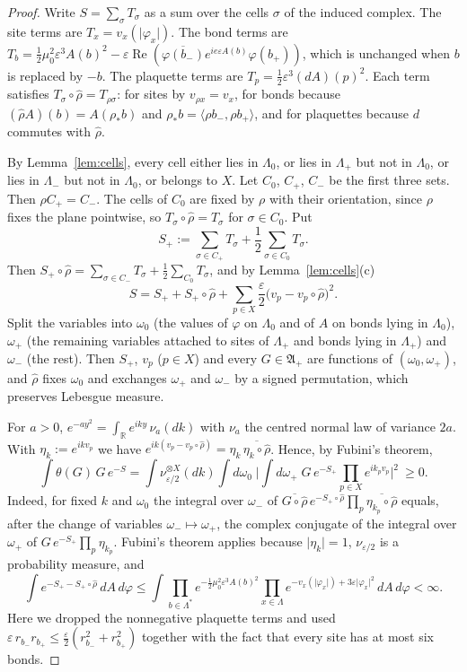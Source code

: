 \documentclass[11pt]{amsart}
\theoremstyle{plain}
\theoremstyle{definition}
\theoremstyle{remark}
\numberwithin{equation}{section}
\newcommand{\R}{\mathbb{R}}
\newcommand{\eps}{\varepsilon}
\newcommand{\fA}{\mathfrak{A}}
\newcommand{\abs}[1]{\lvert #1\rvert}
\newcommand{\ev}[1]{\langle #1\rangle}
\DeclareMathOperator{\re}{Re}
\begin{document}
\begin{proof}
Write $S=\sum_\sigma T_\sigma$ as a sum over the cells $\sigma$ of the induced complex. The site terms are $T_x=v_x(\abs{\varphi_x})$. The bond terms are $T_b=\frac12\mu_0^2\eps^3A(b)^2-\eps\re(\overline{\varphi(b_-)}e^{ie\eps A(b)}\varphi(b_+))$, which is unchanged when $b$ is replaced by $-b$. The plaquette terms are $T_p=\frac12\eps^3(dA)(p)^2$. Each term satisfies $T_\sigma\circ\hat\rho=T_{\rho\sigma}$: for sites by $v_{\rho x}=v_x$, for bonds because $(\hat\rho A)(b)=A(\rho_*b)$ and $\rho_*b=\ev{\rho b_-,\rho b_+}$, and for plaquettes because $d$ commutes with $\hat\rho$.

By Lemma~\ref{lem:cells}, every cell either lies in $\Lambda_0$, or lies in $\Lambda_+$ but not in $\Lambda_0$, or lies in $\Lambda_-$ but not in $\Lambda_0$, or belongs to $X$. Let $C_0$, $C_+$, $C_-$ be the first three sets. Then $\rho C_+=C_-$. The cells of $C_0$ are fixed by $\rho$ with their orientation, since $\rho$ fixes the plane pointwise, so $T_\sigma\circ\hat\rho=T_\sigma$ for $\sigma\in C_0$. Put
\[
S_+:=\sum_{\sigma\in C_+}T_\sigma+\frac12\sum_{\sigma\in C_0}T_\sigma .
\]
Then $S_+\circ\hat\rho=\sum_{\sigma\in C_-}T_\sigma+\frac12\sum_{C_0}T_\sigma$, and by Lemma~\ref{lem:cells}(c)
\[
S=S_++S_+\circ\hat\rho+\sum_{p\in X}\frac\eps2\big(v_p-v_p\circ\hat\rho\big)^2 .
\]
Split the variables into $\omega_0$ (the values of $\varphi$ on $\Lambda_0$ and of $A$ on bonds lying in $\Lambda_0$), $\omega_+$ (the remaining variables attached to sites of $\Lambda_+$ and bonds lying in $\Lambda_+$) and $\omega_-$ (the rest). Then $S_+$, $v_p$ ($p\in X$) and every $G\in\fA_+$ are functions of $(\omega_0,\omega_+)$, and $\hat\rho$ fixes $\omega_0$ and exchanges $\omega_+$ and $\omega_-$ by a signed permutation, which preserves Lebesgue measure.

For $a>0$, $e^{-ay^2}=\int_\R e^{iky}\,\nu_a(dk)$ with $\nu_a$ the centred normal law of variance $2a$. With $\eta_k:=e^{ikv_p}$ we have $e^{ik(v_p-v_p\circ\hat\rho)}=\eta_k\,\overline{\eta_k\circ\hat\rho}$. Hence, by Fubini's theorem,
\[
\int\theta(G)\,G\,e^{-S}=\int\nu_{\eps/2}^{\otimes X}(dk)\int d\omega_0\;\Big|\int d\omega_+\;G\,e^{-S_+}\prod_{p\in X}e^{ik_pv_p}\Big|^2\ \ge0 .
\]
Indeed, for fixed $k$ and $\omega_0$ the integral over $\omega_-$ of $\overline{G\circ\hat\rho}\,e^{-S_+\circ\hat\rho}\prod_p\overline{\eta_{k_p}\circ\hat\rho}$ equals, after the change of variables $\omega_-\mapsto\omega_+$, the complex conjugate of the integral over $\omega_+$ of $G\,e^{-S_+}\prod_p\eta_{k_p}$. Fubini's theorem applies because $\abs{\eta_k}=1$, $\nu_{\eps/2}$ is a probability measure, and
\[
\int e^{-S_+-S_+\circ\hat\rho}\,dA\,d\varphi\le\int\prod_{b\in\Lambda^*}e^{-\frac12\mu_0^2\eps^3A(b)^2}\prod_{x\in\Lambda}e^{-v_x(\abs{\varphi_x})+3\eps\abs{\varphi_x}^2}\,dA\,d\varphi<\infty .
\]
Here we dropped the nonnegative plaquette terms and used $\eps\,r_{b_-}r_{b_+}\le\frac\eps2(r_{b_-}^2+r_{b_+}^2)$ together with the fact that every site has at most six bonds.
\end{proof}
\end{document}
